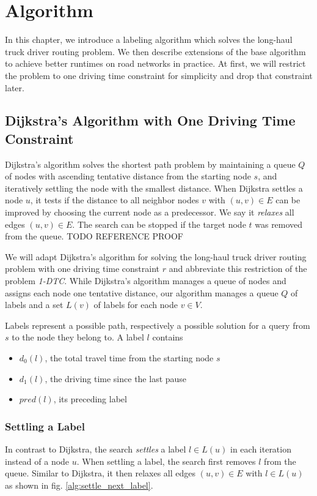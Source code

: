 
\chapter{Algorithm}
\label{ch:Algorithm}
In this chapter, we introduce a labeling algorithm which solves the long-haul truck driver routing problem. We then describe extensions of the base algorithm to achieve better runtimes on road networks in practice. At first, we will restrict the problem to one driving time constraint for simplicity and drop that constraint later.

\section{Dijkstra's Algorithm with One Driving Time Constraint}
Dijkstra's algorithm solves the shortest path problem by maintaining a queue $Q$ of nodes with ascending tentative distance from the starting node $s$, and iteratively settling the node with the smallest distance. When Dijkstra settles a node $u$, it tests if the distance to all neighbor nodes $v$ with $(u,v) \in E$ can be improved by choosing the current node as a predecessor. We say it \emph{relaxes} all edges $(u,v) \in E$. The search can be stopped if the target node $t$ was removed from the queue. TODO REFERENCE PROOF

We will adapt Dijkstra's algorithm for solving the long-haul truck driver routing problem with one driving time constraint $r$ and abbreviate this restriction of the problem \emph{1-DTC}. While Dijkstra's algorithm manages a queue of nodes and assigns each node one tentative distance, our algorithm manages a queue $Q$ of labels and a set $L(v)$ of labels for each node $v \in V$.

Labels represent a possible path, respectively a possible solution for a query from $s$ to the node they belong to. A label $l$ contains

\begin{itemize}
	\item $d_0(l)$, the total travel time from the starting node $s$
	\item $d_1(l)$, the driving time since the last pause
	\item $pred(l)$, its preceding label
\end{itemize}

\subsection{Settling a Label}
In contrast to Dijkstra, the search \emph{settles} a label $l \in L(u)$ in each iteration instead of a node $u$. When settling a label, the search first removes $l$ from the queue. Similar to Dijkstra, it then relaxes all edges $(u,v) \in E$ with $l \in L(u)$ as shown in fig. \ref{alg:settle_next_label}.

